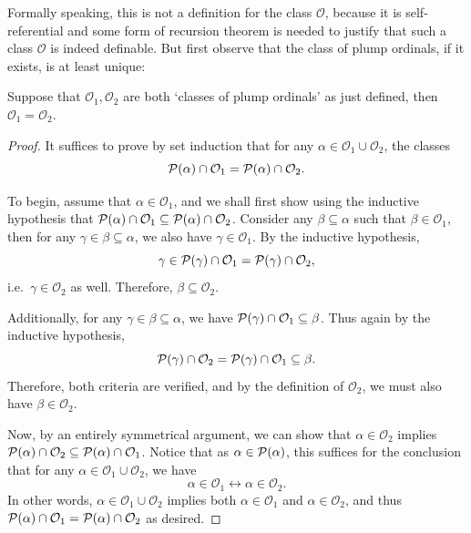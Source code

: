 \documentclass[12pt,openany]{book}
\theoremstyle{plain}
\theoremstyle{definition}
\newcommand\Pow{\mathcal{P}}
\begin{document}
Formally speaking, this is not a definition for the class $\mathcal{O}$, because it is self-referential and some form of recursion theorem is needed to justify that such a class $\mathcal{O}$ is indeed definable. But first observe that the class of plump ordinals, if it exists, is at least unique:
\begin{proposition}
  Suppose that $\mathcal{O}_1, \mathcal{O}_2$ are both `classes of plump ordinals' as just defined, then $\mathcal{O}_1 = \mathcal{O}_2$.
\end{proposition}

\begin{proof}
  It suffices to prove by set induction that for any $\alpha \in \mathcal{O}_1 \cup \mathcal{O}_2$, the classes
  \[\Pow\mleft(\alpha\mright) \cap \mathcal{O}_1 = \Pow\mleft(\alpha\mright) \cap \mathcal{O}_2.\]

  To begin, assume that $\alpha \in \mathcal{O}_1$, and we shall first show using the inductive hypothesis that $\Pow\mleft(\alpha\mright) \cap \mathcal{O}_1 \subseteq \Pow\mleft(\alpha\mright) \cap \mathcal{O}_2$. Consider any $\beta \subseteq \alpha$ such that $\beta \in \mathcal{O}_1$, then for any $\gamma \in \beta \subseteq \alpha$, we also have $\gamma \in \mathcal{O}_1$. By the inductive hypothesis,
  \[\gamma \in \Pow\mleft(\gamma\mright) \cap \mathcal{O}_1 = \Pow\mleft(\gamma\mright) \cap \mathcal{O}_2,\]
  i.e.\ $\gamma \in \mathcal{O}_2$ as well. Therefore, $\beta \subseteq \mathcal{O}_2$.

  Additionally, for any $\gamma \in \beta \subseteq \alpha$, we have $\Pow\mleft(\gamma\mright) \cap \mathcal{O}_1 \subseteq \beta$. Thus again by the inductive hypothesis,
  \[\Pow\mleft(\gamma\mright) \cap \mathcal{O}_2 = \Pow\mleft(\gamma\mright) \cap \mathcal{O}_1 \subseteq \beta.\]
  Therefore, both criteria are verified, and by the definition of $\mathcal{O}_2$, we must also have $\beta \in \mathcal{O}_2$.

  Now, by an entirely symmetrical argument, we can show that $\alpha \in \mathcal{O}_2$ implies $\Pow\mleft(\alpha\mright) \cap \mathcal{O}_2 \subseteq \Pow\mleft(\alpha\mright) \cap \mathcal{O}_1$. Notice that as $\alpha \in \Pow\mleft(\alpha\mright)$, this suffices for the conclusion that for any $\alpha \in \mathcal{O}_1 \cup \mathcal{O}_2$, we have
  \[\alpha \in \mathcal{O}_1 \leftrightarrow \alpha \in \mathcal{O}_2.\]
  In other words, $\alpha \in \mathcal{O}_1 \cup \mathcal{O}_2$ implies both $\alpha \in \mathcal{O}_1$ and $\alpha \in \mathcal{O}_2$, and thus $\Pow\mleft(\alpha\mright) \cap \mathcal{O}_1 = \Pow\mleft(\alpha\mright) \cap \mathcal{O}_2$ as desired.
\end{proof}
\end{document}
